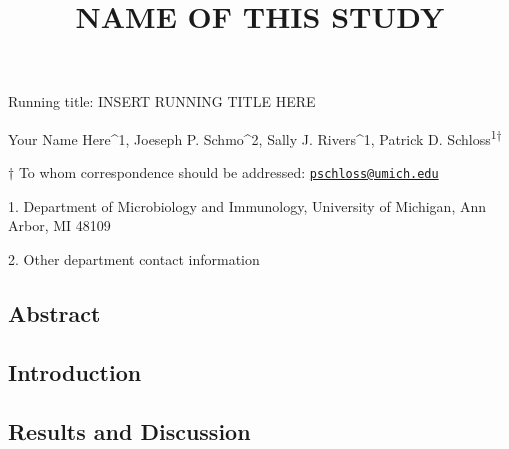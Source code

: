 \documentclass[11pt,]{article}
\title{\textbf{NAME OF THIS STUDY}}
\author{}
\date{}
\begin{document}
\maketitle

\vspace{35mm}

Running title: INSERT RUNNING TITLE HERE

\vspace{35mm}

Your Name Here\^{}1, Joeseph P. Schmo\^{}2, Sally J. Rivers\^{}1,
Patrick D. Schloss\textsuperscript{1\(\dagger\)}

\vspace{40mm}

\(\dagger\) To whom correspondence should be addressed:
\href{mailto:pschloss@umich.edu}{\nolinkurl{pschloss@umich.edu}}

1. Department of Microbiology and Immunology, University of Michigan,
Ann Arbor, MI 48109

2. Other department contact information

\newpage

\linenumbers

\subsection{Abstract}\label{abstract}

\newpage

\subsection{Introduction}\label{introduction}

\subsection{Results and Discussion}\label{results-and-discussion}
\end{document}

